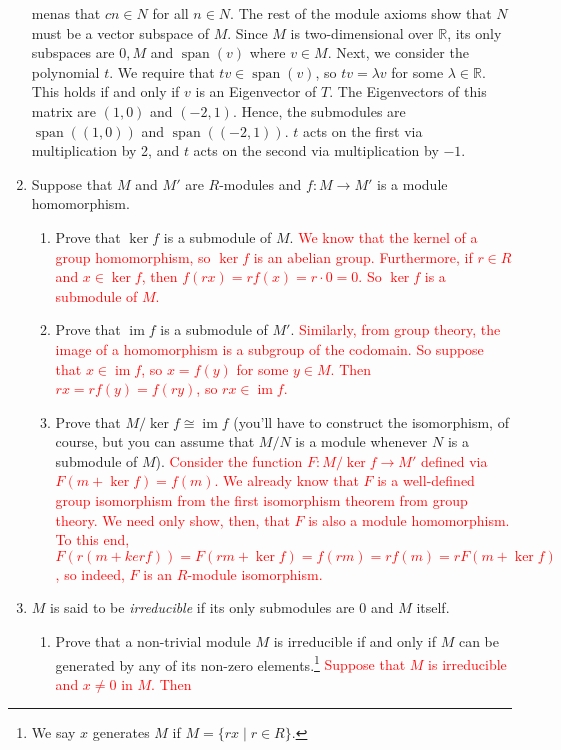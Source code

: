 \documentclass[12pt]{article}
\newcommand{\bbR}{\mathbb{R}}
\newcommand{\im}{\operatorname{im}}
\newcommand{\solution}[1]{\textcolor{red}{#1}}
\begin{document}
\begin{enumerate}
{menas that $cn\in N$ for all $n\in N$. The rest of the module axioms
show that $N$ must be a vector subspace of $M$. Since $M$ is
two-dimensional over $\bbR$, its only subspaces are $0, M$ and
$\operatorname{span}(v)$ where $v\in M$. 
Next, we consider the polynomial $t$. We require that $tv\in
\operatorname{span}(v)$, so $tv=\lambda v$ for some $\lambda \in
\bbR$. This holds if and only if $v$ is an Eigenvector of $T$. The
Eigenvectors of this matrix are $(1,0)$ and $(-2,1)$. Hence, the
submodules are $\operatorname{span}((1,0))$ and
$\operatorname{span}((-2,1))$. $t$ acts on the first via
multiplication by 2, and $t$ acts on the second via multiplication by
$-1$. 
}
\item Suppose that $M$ and $M'$ are $R$-modules and $f: M\rightarrow
  M'$ is a module homomorphism.
  \begin{enumerate}
  \item Prove that $\ker f$ is a submodule of $M$.
\solution{We know that the kernel of a group homomorphism, so $\ker f$
  is an abelian group. Furthermore, if $r\in R$ and $x\in \ker f$,
  then $f(rx) = rf(x) = r\cdot 0=0$. So $\ker f$ is a submodule of $M$.}
  \item Prove that $\im f$ is a submodule of $M'$.
\solution{Similarly, from group theory, the image of a homomorphism is
  a subgroup of the codomain. So suppose that $x\in \im f$, so
  $x=f(y)$ for some $y\in M$. Then $rx=rf(y)=f(ry)$, so $rx\in \im
  f$. }
  \item Prove that $M/\ker f\cong \im f$ (you'll have to construct the
    isomorphism, of course, but you can assume that $M/N$ is a module
    whenever $N$ is a submodule of $M$). 
\solution{
Consider the function $F: M/\ker f \rightarrow M'$ defined via
$F(m+\ker f) = f(m)$. We already know that $F$ is a well-defined group
isomorphism from the first isomorphism theorem from group theory. We
need only show, then, that $F$ is also a module homomorphism. To this
end, $F(r(m+ker f)) = F(rm+\ker f) = f(rm) = rf(m) = rF(m+\ker f)$, so
indeed, $F$ is an $R$-module isomorphism.
}
  \end{enumerate}
\item $M$ is said to be \emph{irreducible} if its only submodules are
  $0$ and $M$ itself.
  \begin{enumerate}
  \item Prove that a non-trivial module $M$ is irreducible if and only
    if $M$ can be generated by any of its non-zero
    elements.\footnote{We say $x$ generates $M$ if $M=\{rx\mid r\in
      R\}$.}
\solution{Suppose that $M$ is irreducible and  $x\neq 0$ in $M$. Then
}
\end{enumerate}
\end{enumerate}
\end{document}
